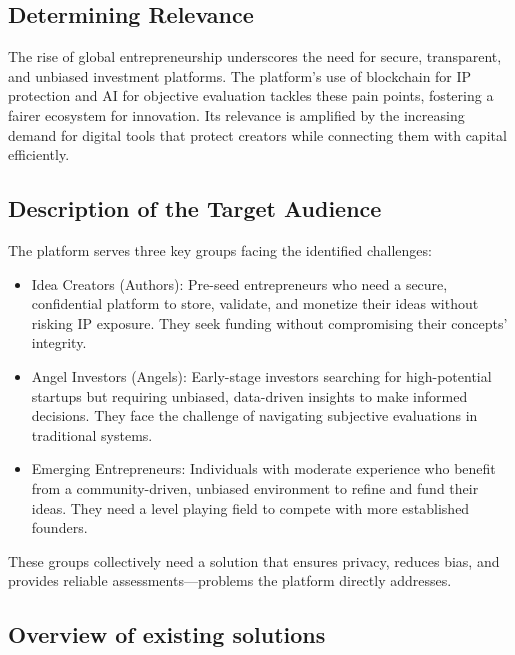 \documentclass[12pt]{article}
\begin{document}
\subsection{Determining Relevance}
The rise of global entrepreneurship underscores the need for secure, transparent, and unbiased investment platforms. The platform's use of blockchain for IP protection and AI for objective evaluation tackles these pain points, fostering a fairer ecosystem for innovation. Its relevance is amplified by the increasing demand for digital tools that protect creators while connecting them with capital efficiently.

\subsection{Description of the Target Audience}
The platform serves three key groups facing the identified challenges:

\begin{itemize}
    \item Idea Creators (Authors): Pre-seed entrepreneurs who need a secure, confidential platform to store, validate, and monetize their ideas without risking IP exposure. They seek funding without compromising their concepts' integrity.
    \item Angel Investors (Angels): Early-stage investors searching for high-potential startups but requiring unbiased, data-driven insights to make informed decisions. They face the challenge of navigating subjective evaluations in traditional systems.
    \item Emerging Entrepreneurs: Individuals with moderate experience who benefit from a community-driven, unbiased environment to refine and fund their ideas. They need a level playing field to compete with more established founders.
\end{itemize}

These groups collectively need a solution that ensures privacy, reduces bias, and provides reliable assessments—problems the platform directly addresses.

\subsection{Overview of existing solutions}
\end{document}
